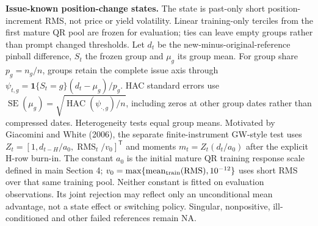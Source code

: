 \documentclass[11pt,a4paper]{article}
\begin{document}
\textbf{Issue-known position-change states.} The state is past-only short position-increment RMS, not price or yield volatility. Linear training-only terciles from the first mature QR pool are frozen for evaluation; ties can leave empty groups rather than prompt changed thresholds. Let \(d_t\) be the new-minus-original-reference pinball difference, \(S_t\) the frozen group and \(\mu_g\) its group mean. For group share \(p_g=n_g/n\), groups retain the complete issue axis through \(\psi_{t,g}=\mathbf1\{S_t=g\}(d_t-\mu_g)/p_g\). HAC standard errors use \(\operatorname{SE}(\mu_g)=\sqrt{\operatorname{HAC}(\psi_{\cdot,g})/n}\), including zeros at other group dates rather than compressed dates. Heterogeneity tests equal group means. Motivated by Giacomini and White (2006), the separate finite-instrument GW-style test uses \(Z_t=[1,d_{t-H}/a_0,\operatorname{RMS}_t/v_0]^{\mathsf T}\) and moments \(m_t=Z_t(d_t/a_0)\) after the explicit H-row burn-in. The constant \(a_0\) is the initial mature QR training response scale defined in main Section 4; \(v_0=\max\{\operatorname{mean}_{\rm train}(\operatorname{RMS}),10^{-12}\}\) uses short RMS over that same training pool. Neither constant is fitted on evaluation observations. Its joint rejection may reflect only an unconditional mean advantage, not a state effect or switching policy. Singular, nonpositive, ill-conditioned and other failed references remain NA.
\end{document}
